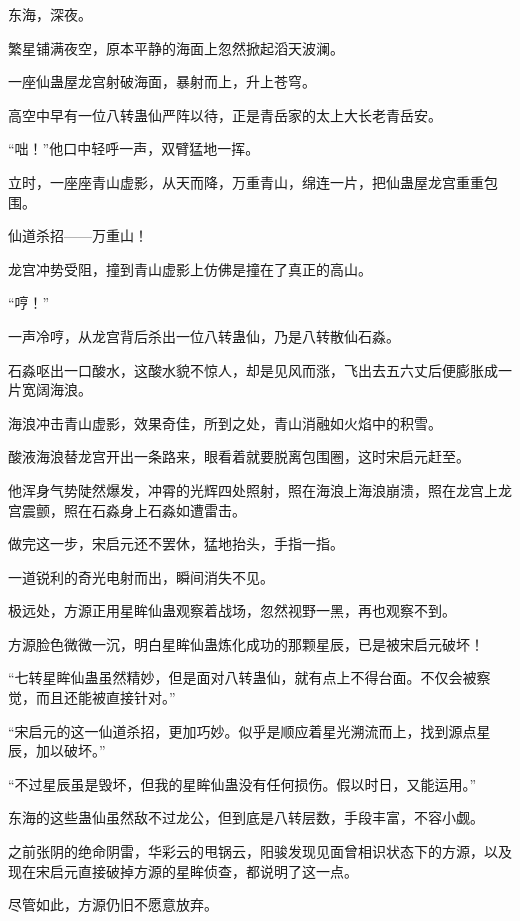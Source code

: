 
\begin{this_body}

东海，深夜。

繁星铺满夜空，原本平静的海面上忽然掀起滔天波澜。

一座仙蛊屋龙宫射破海面，暴射而上，升上苍穹。

高空中早有一位八转蛊仙严阵以待，正是青岳家的太上大长老青岳安。

“咄！”他口中轻呼一声，双臂猛地一挥。

立时，一座座青山虚影，从天而降，万重青山，绵连一片，把仙蛊屋龙宫重重包围。

仙道杀招——万重山！

龙宫冲势受阻，撞到青山虚影上仿佛是撞在了真正的高山。

“哼！”

一声冷哼，从龙宫背后杀出一位八转蛊仙，乃是八转散仙石淼。

石淼呕出一口酸水，这酸水貌不惊人，却是见风而涨，飞出去五六丈后便膨胀成一片宽阔海浪。

海浪冲击青山虚影，效果奇佳，所到之处，青山消融如火焰中的积雪。

酸液海浪替龙宫开出一条路来，眼看着就要脱离包围圈，这时宋启元赶至。

他浑身气势陡然爆发，冲霄的光辉四处照射，照在海浪上海浪崩溃，照在龙宫上龙宫震颤，照在石淼身上石淼如遭雷击。

做完这一步，宋启元还不罢休，猛地抬头，手指一指。

一道锐利的奇光电射而出，瞬间消失不见。

极远处，方源正用星眸仙蛊观察着战场，忽然视野一黑，再也观察不到。

方源脸色微微一沉，明白星眸仙蛊炼化成功的那颗星辰，已是被宋启元破坏！

“七转星眸仙蛊虽然精妙，但是面对八转蛊仙，就有点上不得台面。不仅会被察觉，而且还能被直接针对。”

“宋启元的这一仙道杀招，更加巧妙。似乎是顺应着星光溯流而上，找到源点星辰，加以破坏。”

“不过星辰虽是毁坏，但我的星眸仙蛊没有任何损伤。假以时日，又能运用。”

东海的这些蛊仙虽然敌不过龙公，但到底是八转层数，手段丰富，不容小觑。

之前张阴的绝命阴雷，华彩云的甩锅云，阳骏发现见面曾相识状态下的方源，以及现在宋启元直接破掉方源的星眸侦查，都说明了这一点。

尽管如此，方源仍旧不愿意放弃。


\end{this_body}
